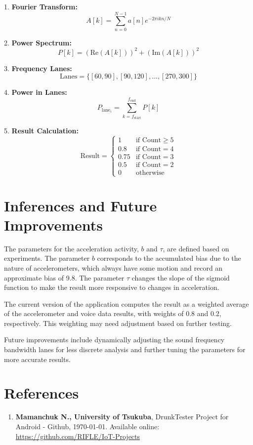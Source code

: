 \documentclass[12pt,a4paper]{article}
\begin{document}
1. \textbf{Fourier Transform:}
\[ A[k] = \sum_{n=0}^{N-1} a[n] e^{-2\pi ikn/N} \]

2. \textbf{Power Spectrum:}
\[ P[k] = (\text{Re}(A[k]))^2 + (\text{Im}(A[k]))^2 \]

3. \textbf{Frequency Lanes:}
\[ \text{Lanes} = \{ [60, 90], [90, 120], \ldots, [270, 300] \} \]

4. \textbf{Power in Lanes:}
\[ P_{\text{lane}_i} = \sum_{k=f_{\text{start}}}^{f_{\text{end}}} P[k] \]

5. \textbf{Result Calculation:}
\[ \text{Result} = \left\{
\begin{array}{ll}
1 & \text{if Count} \geq 5 \\
0.8 & \text{if Count} = 4 \\
0.75 & \text{if Count} = 3 \\
0.5 & \text{if Count} = 2 \\
0 & \text{otherwise}
\end{array} \right. \]

\section{Inferences and Future Improvements}

The parameters for the acceleration activity, \( b \) and \( \tau \), are defined based on experiments. The parameter \( b \) corresponds to the accumulated bias due to the nature of accelerometers, which always have some motion and record an approximate bias of 9.8. The parameter \( \tau \) changes the slope of the sigmoid function to make the result more responsive to changes in acceleration.

The current version of the application computes the result as a weighted average of the accelerometer and voice data results, with weights of 0.8 and 0.2, respectively. This weighting may need adjustment based on further testing.

Future improvements include dynamically adjusting the sound frequency bandwidth lanes for less discrete analysis and further tuning the parameters for more accurate results.

\section*{References}
\begin{enumerate}
    \item \textbf{Mamanchuk N., University of Tsukuba}, DrunkTester Project for Android - Github, \today. Available online: \url{https://github.com/RIFLE/IoT-Projects}
\end{enumerate}
\end{document}
